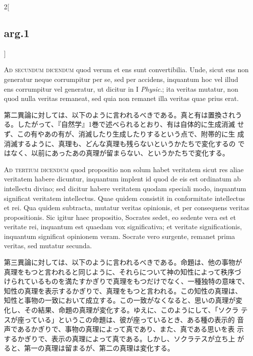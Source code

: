 \documentclass[paper=a4paper,fontsize=10pt,jafontsize=9pt,titlepage]{jlreq}
\begin{document}
\begin{paracol}{2}[\subsection{arg.1}]
\switchcolumn*[\subsection{ad.2}]


{\scshape Ad secundum dicendum} quod verum et ens sunt
convertibilia. Unde, sicut ens non generatur neque corrumpitur per se,
sed per accidens, inquantum hoc vel illud ens corrumpitur vel
generatur, ut dicitur in I {\itshape Physic}.; ita veritas mutatur,
non quod nulla veritas remaneat, sed quia non remanet illa veritas
quae prius erat.

\switchcolumn

第二異論に対しては、以下のように言われるべきである。真と有は置換されう
る。したがって、『自然学』1巻で述べられるとおり、有は自体的に生成消滅
せず、この有やあの有が、消滅したり生成したりするという点で、附帯的に生
成消滅するように、真理も、どんな真理も残らないというかたちで変化するの
ではなく、以前にあったあの真理が留まらない、というかたちで変化する。

\switchcolumn*[\subsection{ad.3}]


{\scshape Ad tertium dicendum} quod propositio non solum habet
veritatem sicut res aliae veritatem habere dicuntur, inquantum implent
id quod de eis est ordinatum ab intellectu divino; sed dicitur habere
veritatem quodam speciali modo, inquantum significat veritatem
intellectus. Quae quidem consistit in conformitate intellectus et
rei. Qua quidem subtracta, mutatur veritas opinionis, et per
consequens veritas propositionis. Sic igitur haec propositio, Socrates
sedet, eo sedente vera est et veritate rei, inquantum est quaedam vox
significativa; et veritate significationis, inquantum significat
opinionem veram. Socrate vero surgente, remanet prima veritas, sed
mutatur secunda.

\switchcolumn

第三異論に対しては、以下のように言われるべきである。命題は、他の事物が
真理をもつと言われると同じように、それらについて神の知性によって秩序づ
けられているものを満たすかぎりで真理をもつだけでなく、一種独特の意味で、
知性の真理を表示するかぎりで、真理をもつと言われる。この知性の真理は、
知性と事物の一致において成立する。この一致がなくなると、思いの真理が変
化し、その結果、命題の真理が変化する。ゆえに、このようにして、「ソクラ
テスが座っている」というこの命題は、彼が座っているとき、ある種の表示的
音声であるかぎりで、事物の真理によって真であり、また、真である思いを表
示するかぎりで、表示の真理によって真である。しかし、ソクラテスが立ち上
がると、第一の真理は留まるが、第二の真理は変化する。


\end{paracol}
\end{document}
